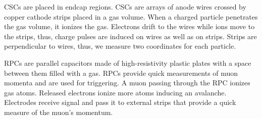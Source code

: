 
CSCs are placed in endcap regions. CSCs are arrays of anode wires crossed by copper cathode strips placed in a gas volume. When a charged particle penetrates the gas volume, it ionizes the gas. Electrons drift to the wires while ions move to the strips, thus, charge pulses are induced on wires as well as on strips. Strips are perpendicular to wires, thus, we measure two coordinates for each particle.  

RPCs are parallel capacitors made of high-resistivity plastic plates with a space between them filled with a gas. RPCs provide quick measurements of muon momenta and are used for triggering. A muon passing through the RPC ionizes gas atoms. Released electrons ionize more atoms inducing an avalanche. Electrodes receive signal and pass it to external strips that provide a quick measure of the muon's momentum. 


